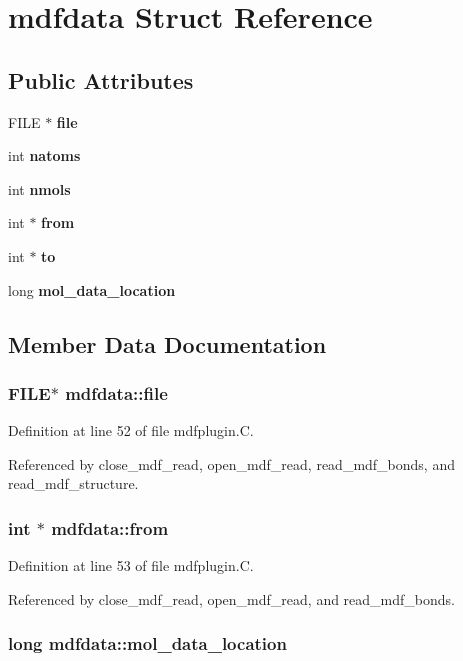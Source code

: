 \section{mdfdata  Struct Reference}
\label{structmdfdata}
\subsection*{Public Attributes}
\begin{CompactItemize}
\item 
FILE $\ast$ {\bf file}
\item 
int {\bf natoms}
\item 
int {\bf nmols}
\item 
int $\ast$ {\bf from}
\item 
int $\ast$ {\bf to}
\item 
long {\bf mol\_\-data\_\-location}
\end{CompactItemize}


\subsection{Member Data Documentation}
\subsubsection{\setlength{\rightskip}{0pt plus 5cm}FILE$\ast$ mdfdata::file}\label{structmdfdata_m0}




Definition at line 52 of file mdfplugin.C.

Referenced by close\_\-mdf\_\-read, open\_\-mdf\_\-read, read\_\-mdf\_\-bonds, and read\_\-mdf\_\-structure.
\subsubsection{\setlength{\rightskip}{0pt plus 5cm}int $\ast$ mdfdata::from}\label{structmdfdata_m3}




Definition at line 53 of file mdfplugin.C.

Referenced by close\_\-mdf\_\-read, open\_\-mdf\_\-read, and read\_\-mdf\_\-bonds.
\subsubsection{\setlength{\rightskip}{0pt plus 5cm}long mdfdata::mol\_\-data\_\-location}\label{structmdfdata_m5}




